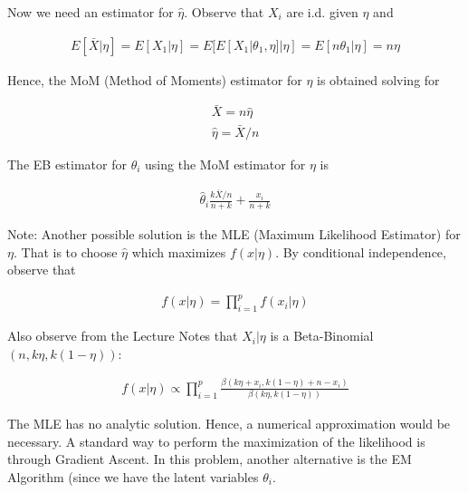 \documentclass[11pt]{article}
\begin{document}
\begin{enumerate}
\begin{enumerate}
	Now we need an estimator for $\hat{\eta}$. Observe that $X_{i}$ are i.d. given $\eta$ and
	
	\begin{align*}
		E[\bar{X}|\eta] = E[X_{1}|\eta] = E[E[X_{1}|\theta_{1},\eta]|\eta] = E[n\theta_{1}|\eta] = n\eta 
	\end{align*}
	
	Hence, the MoM (Method of Moments) estimator for $\eta$ is obtained solving for
	
	\begin{align*}
		\bar{X} = n\hat{\eta} \\
		\hat{\eta} = \bar{X}/n
	\end{align*}
	
	The EB estimator for $\theta_{i}$ using the MoM estimator for $\eta$ is 
	
	\begin{align*}
		\hat{\theta}_{i} \frac{k\bar{X}/n}{n+k} + \frac{x_{i}}{n+k}
	\end{align*}
	
	Note: Another possible solution is the MLE (Maximum Likelihood Estimator) for $\eta$. That is to choose $\hat{\eta}$ which maximizes $f(x|\eta)$. By conditional independence, observe that
	
	\begin{align*}
		f(x|\eta) = \prod_{i=1}^{p}{f(x_{i}|\eta)} 
	\end{align*}
	
	Also observe from the Lecture Notes that $X_{i}|\eta$ is a Beta-Binomial$(n,k\eta,k(1-\eta))$:
	
	\begin{align*}
		f(x|\eta) \propto \prod_{i=1}^{p}{\frac{\beta(k\eta+x_{i},k(1-\eta)+n-x_{i})}{\beta(k\eta,k(1-\eta))}}
	\end{align*}
	
	The MLE has no analytic solution. Hence, a numerical approximation would be necessary. A standard way to perform the maximization of the likelihood is through Gradient Ascent. In this problem, another alternative is the EM Algorithm (since we have the latent variables $\theta_{i}$. 
\end{enumerate}


\end{enumerate}
\end{document}
